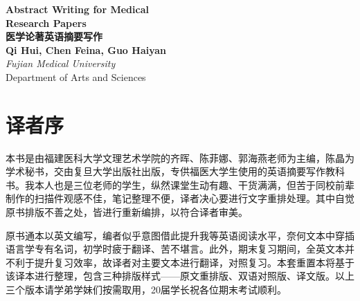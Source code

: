 \documentclass{ctexbook}
\begin{document}
\begin{titlepage}
    \begin{center}
      {\huge\bfseries Abstract Writing for Medical \\\vspace{3pt} Research Papers}\\[3ex]
      {\huge\bfseries 医学论著英语摘要写作}\\[6.5ex]
      {\large\bfseries Qi Hui, Chen Feina, Guo Haiyan}           \\
      \vspace{4ex}
      \textit{Fujian Medical University}                \\[2cm]


      \vfill
      Department of Arts and Sciences\\
      \vfill
      \date{}
    \end{center}
\end{titlepage}

\frontmatter
\chapter*{译者序}

本书是由福建医科大学文理艺术学院的齐晖、陈菲娜、郭海燕老师为主编，陈晶为学术秘书，交由复旦大学出版社出版，专供福医大学生使用的英语摘要写作教科书。我本人也是三位老师的学生，纵然课堂生动有趣、干货满满，但苦于同校前辈制作的扫描件观感不佳，笔记整理不便，译者决心要进行文字重排处理。其中自觉原书排版不善之处，皆进行重新编排，以符合译者审美。

原书通本以英文编写，编者似乎意图借此提升我等英语阅读水平，奈何文本中穿插语言学专有名词，初学时疲于翻译、苦不堪言。此外，期末复习期间，全英文本并不利于提升复习效率，故译者对主要文本进行翻译，对照复习。本套重置本将基于该译本进行整理，包含三种排版样式——原文重排版、双语对照版、译文版。以上三个版本请学弟学妹们按需取用，20届学长祝各位期末考试顺利。
\end{document}
